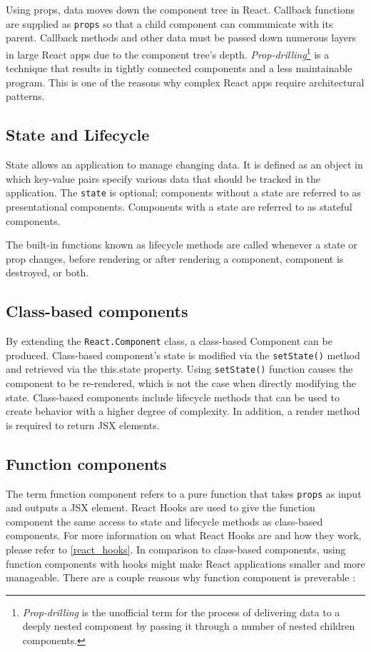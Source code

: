 Using props, data moves down the component tree in React. Callback functions are supplied as \texttt{props} so that a child component can communicate with its parent. Callback methods and other data must be passed down numerous layers in large React apps due to the component tree's depth. \emph{Prop-drilling}\footnote{\emph{Prop-drilling} is the unofficial term for the process of delivering data to a deeply nested component by passing it through a number of nested children components.} is a technique that results in tightly connected components and a less maintainable program. This is one of the reasons why complex React apps require architectural patterns.

\subsection{State and Lifecycle}
State allows an application to manage changing data. It is defined as an object in which key-value pairs specify various data that should be tracked in the application. The \texttt{state} is optional; components without a state are referred to as presentational components. Components with a state are referred to as stateful components.

The built-in functions known as lifecycle methods are called whenever a state or prop changes, before rendering or after rendering a component, component is destroyed, or both.

\subsection{Class-based components}
By extending the \texttt{React.Component} class, a class-based Component can be produced. Class-based component's state is modified via the \texttt{setState()} method and retrieved via the this.state property. Using \texttt{setState()} function causes the component to be re-rendered, which is not the case when directly modifying the state. Class-based components include lifecycle methods that can be used to create behavior with a higher degree of complexity. In addition, a render method is required to return JSX elements.


\subsection{Function components}
The term function component refers to a pure function that takes \texttt{props} as input and outputs a JSX element. React Hooks are used to give the function component the same access to state and lifecycle methods as class-based components. For more information on what React Hooks are and how they work, please refer to \autoref{react_hooks}. In comparison to class-based components, using function components with hooks might make React applications smaller and more manageable. There are a couple reasons why function component is preverable \autocite{phan2020react}:

